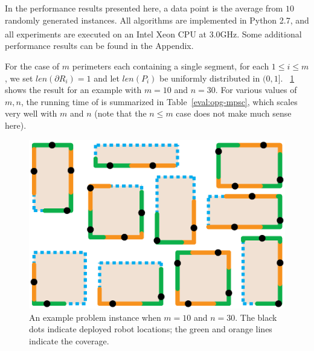 In the performance results presented here, a data point is the 
average from $10$ randomly generated \opg instances. All algorithms 
are implemented in Python 2.7, and all experiments are executed on 
an Intel\textsuperscript{\textregistered} Xeon\textsuperscript{\textregistered} 
CPU at 3.0GHz. %
Some additional performance results can be found in the Appendix.

For the case of $m$ perimeters each containing a single segment, for 
each $1 \le i \le m$, we set $len(\partial R_i) = 1$ and let $len(P_i)$ 
be uniformly distributed in $(0, 1]$. ~\ref{fig:opg-mpsc-example} shows 
the result for an example with $m = 10$ and $n = 30$. For various values 
of $m, n$, the running time of \algoMRSimple is summarized in 
Table~\ref{eval:opg-mpsc}, which scales very well with $m$ and $n$ (note that 
the $n \le m$ case does not make much sense here). 

\begin{figure}[ht!]
    \vspace*{-3mm}
    \centering
    \includegraphics[keepaspectratio, scale=0.32]{./chapters/opg/figures/mpsc-example.eps}
    \vspace*{-6mm}
    \caption{\label{fig:opg-mpsc-example} 
    An example problem instance when $m = 10$ and $n = 30$. The black dots
		indicate deployed robot locations; the green and orange lines indicate
		the coverage.
		}
    \vspace*{-2mm}
\end{figure}

